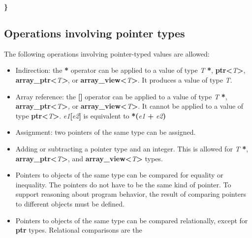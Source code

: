 \documentclass[]{article}
\begin{document}
\textbf{\}}

\subsection{\texorpdfstring{\protect\hypertarget{ux5fToc422906958}{}{\protect\hypertarget{ux5fToc424307682}{}{\protect\hypertarget{ux5fToc426641060}{}{\protect\hypertarget{ux5fToc435434920}{}{\protect\hypertarget{ux5fToc437460741}{}{\protect\hypertarget{ux5fToc440445413}{}{\protect\hypertarget{ux5fToc440449195}{}{\protect\hypertarget{ux5fToc440551845}{}{}}}}}}}}Operations
involving pointer
types}{Operations involving pointer types}}\label{operations-involving-pointer-types}

The following operations involving pointer-typed values are allowed:

\begin{itemize}
\item
  Indirection: the \textbf{*} operator can be applied to a value of type
  \emph{T} \textbf{*},
  \textbf{ptr\textless{}}\emph{T}\textbf{\textgreater{}},
  \textbf{array\_ptr\textless{}}\emph{T\textbf{\textgreater{}}}, or
  \textbf{array\_view\textless{}}\emph{T}\textbf{\textgreater{}}. It
  produces a value of type \emph{T}.
\item
  Array reference: the \textbf{{[}{]}} operator can be applied to a
  value of type \emph{T} \textbf{*},
  \textbf{array\_ptr\textless{}}\emph{T}\textbf{\textgreater{}}\emph{,}
  or \textbf{array\_view\textless{}}\emph{T}\textbf{\textgreater{}}. It
  cannot be applied to a value of type
  \textbf{ptr\textless{}}\emph{T}\textbf{\textgreater{}}.
  \emph{e1}\textbf{{[}}\emph{e2}\textbf{{]}} is equivalent to
  \textbf{*(}\emph{e1} \textbf{+} \emph{e2}\textbf{)}
\item
  Assignment: two pointers of the same type can be assigned.
\item
  Adding or subtracting a pointer type and an integer. This is allowed
  for \emph{T} \textbf{*},
  \textbf{array\_ptr\textless{}}\emph{T}\textbf{\textgreater{}}, and
  \textbf{array\_view\textless{}}\emph{T}\textbf{\textgreater{}} types.
\item
  Pointers to objects of the same type can be compared for equality or
  inequality. The pointers do not have to be the same kind of pointer.
  To support reasoning about program behavior, the result of comparing
  pointers to different objects must be defined.
\item
  Pointers to objects of the same type can be compared relationally,
  except for \textbf{ptr} types. Relational comparisons are the

\end{itemize}
\end{document}
